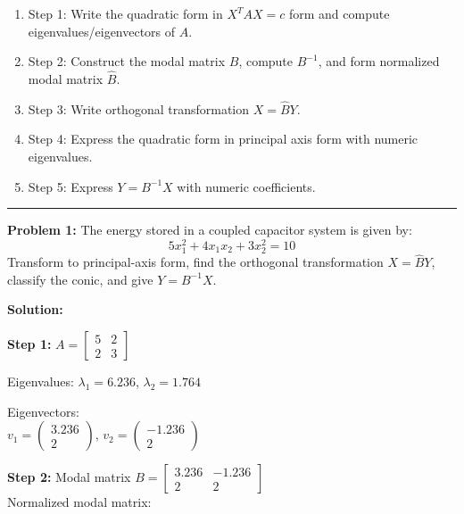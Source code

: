 \documentclass[
  letterpaper,
  DIV=11,
  numbers=noendperiod]{scrreprt}
\providecommand{\tightlist}{%
  \setlength{\itemsep}{0pt}\setlength{\parskip}{0pt}}
\begin{document}
\begin{enumerate}
\def\labelenumi{\arabic{enumi}.}
\tightlist
\item
  Step 1: Write the quadratic form in \(X^TAX = c\) form and compute
  eigenvalues/eigenvectors of \(A\).\\
\item
  Step 2: Construct the modal matrix \(B\), compute \(B^{-1}\), and form
  normalized modal matrix \(\hat{B}\).\\
\item
  Step 3: Write orthogonal transformation \(X = \hat{B}Y\).\\
\item
  Step 4: Express the quadratic form in principal axis form with numeric
  eigenvalues.\\
\item
  Step 5: Express \(Y = B^{-1}X\) with numeric coefficients.
\end{enumerate}

\begin{center}\rule{0.5\linewidth}{0.5pt}\end{center}

\textbf{Problem 1:} The energy stored in a coupled capacitor system is
given by: \[
5x_1^{2}+4x_1x_2+3x_2^{2}=10
\] Transform to principal-axis form, find the orthogonal transformation
\(X=\hat{B}Y\), classify the conic, and give \(Y=B^{-1}X\).

\textbf{Solution:}

\textbf{Step 1:} \(A = \begin{bmatrix}5 & 2\\2 & 3\end{bmatrix}\)

Eigenvalues: \(\lambda_1 = 6.236\), \(\lambda_2 = 1.764\)

Eigenvectors:\\
\(v_1 = \begin{pmatrix}3.236\\2\end{pmatrix}\),
\(v_2 = \begin{pmatrix}-1.236\\2\end{pmatrix}\)

\textbf{Step 2:} Modal matrix
\(B = \begin{bmatrix}3.236 & -1.236\\2 & 2\end{bmatrix}\)\\
Normalized modal matrix:
\end{document}
